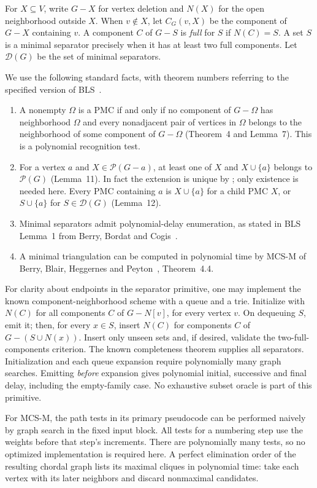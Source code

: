 \documentclass[acmsmall,12pt,screen,nonacm]{acmart}
\newcommand{\PMC}{\mathcal P}
\newcommand{\Sep}{\mathcal D}
\begin{document}
For $X\subseteq V$, write $G-X$ for vertex deletion and $N(X)$ for the open
neighborhood outside $X$. When $v\notin X$, let $C_G(v,X)$ be the component
of $G-X$ containing $v$. A component $C$ of $G-S$ is \emph{full} for $S$ if
$N(C)=S$. A set $S$ is a minimal separator precisely when it has at least
two full components. Let $\Sep(G)$ be the set of minimal separators.

We use the following standard facts, with theorem numbers referring to the
specified version of BLS~\cite{BLS26}.
\begin{enumerate}
\item A nonempty $\Omega$ is a PMC if and only if no component of $G-\Omega$
has neighborhood $\Omega$ and every nonadjacent pair of vertices in $\Omega$
belongs to the neighborhood of some component of $G-\Omega$
(Theorem~4 and Lemma~7). This is a polynomial recognition test.
\item For a vertex $a$ and $X\in\PMC(G-a)$, at least one of $X$ and
$X\cup\{a\}$ belongs to $\PMC(G)$ (Lemma~11). In fact the extension is unique
by \cite[Proposition~1]{BCLPR24}; only existence is needed here.
Every PMC containing $a$ is $X\cup\{a\}$ for a child PMC $X$, or
$S\cup\{a\}$ for $S\in\Sep(G)$ (Lemma~12).
\item Minimal separators admit polynomial-delay enumeration, as stated
in BLS Lemma~1 from Berry, Bordat and Cogis~\cite{BBC99}.
\item A minimal triangulation can be computed in polynomial time by MCS-M
of Berry, Blair, Heggernes and Peyton~\cite{BBHP04}, Theorem~4.4.
\end{enumerate}

For clarity about endpoints in the separator primitive, one may implement
the known component-neighborhood scheme with a queue and a trie. Initialize
with $N(C)$ for all components $C$ of $G-N[v]$, for every vertex $v$.
On dequeuing $S$, emit it; then, for every $x\in S$, insert $N(C)$ for
components $C$ of $G-(S\cup N(x))$. Insert only unseen sets and, if desired,
validate the two-full-components criterion. The known completeness theorem
supplies all separators. Initialization and each queue expansion require
polynomially many graph searches. Emitting \emph{before} expansion gives
polynomial initial, successive and final delay, including the empty-family
case. No exhaustive subset oracle is part of this primitive.

For MCS-M, the path tests in its primary pseudocode can be performed naively
by graph search in the fixed input block. All tests for a numbering step use
the weights before that step's increments. There are polynomially many tests,
so no optimized implementation is required here. A perfect elimination order
of the resulting chordal graph lists its maximal cliques in polynomial time:
take each vertex with its later neighbors and discard nonmaximal candidates.
\end{document}
